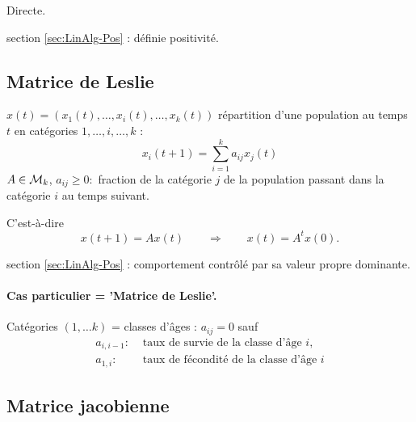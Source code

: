 \proof Directe. \eproof

\remark section \ref{sec:LinAlg-Pos} : définie positivité.

\subsection{Matrice de Leslie}  \label{sec:MatLeslie}

$x(t) = (x_1(t), \dots, x_i(t), \dots, x_k(t))$ répartition d'une population au temps $t$ en catégories $1, \dots, i, \dots, k$ :
$$
x_i(t+1) = \sum_{i=1}^k a_{ij} x_j(t) 
$$
$A \in \mathcal{M}_k$, $a_{ij} \geq 0 : $ fraction de la catégorie $j$ de la population passant dans la catégorie $i$ au temps suivant.

C'est-à-dire
$$
x(t+1) = A x(t) 
\qquad \Rightarrow \qquad 
x(t) = A^t x(0).
$$

\remark section \ref{sec:LinAlg-Pos} : comportement contrôlé par sa valeur propre dominante.

\paragraph{Cas particulier = 'Matrice de Leslie'.}

Catégories $(1, \dots k)$ = classes d'âges : $a_{ij} = 0$ sauf 
\begin{align*}
  a_{i, i-1} : & \text{ taux de survie de la classe d'âge $i$}, \\
  a_{1, i} : & \text{ taux de fécondité de la classe d'âge $i$}
\end{align*}

\subsection{Matrice jacobienne}  \label{sec:MatJacob}

